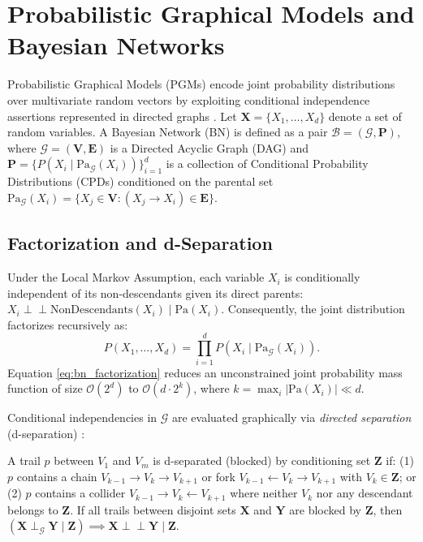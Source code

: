\section{Probabilistic Graphical Models and Bayesian Networks}
\label{sec:bg_pgm}

Probabilistic Graphical Models (PGMs) encode joint probability distributions over multivariate random vectors by exploiting conditional independence assertions represented in directed graphs \parencite{pearl2009causality, ankan2015pgmpy}. Let $\mathbf{X} = \{X_1, \dots, X_d\}$ denote a set of random variables. A Bayesian Network (BN) is defined as a pair $\mathcal{B} = (\mathcal{G}, \mathbf{P})$, where $\mathcal{G} = (\mathbf{V}, \mathbf{E})$ is a Directed Acyclic Graph (DAG) and $\mathbf{P} = \{P(X_i \mid \text{Pa}_{\mathcal{G}}(X_i))\}_{i=1}^d$ is a collection of Conditional Probability Distributions (CPDs) conditioned on the parental set $\text{Pa}_{\mathcal{G}}(X_i) = \{X_j \in \mathbf{V} : (X_j \to X_i) \in \mathbf{E}\}$.

\subsection{Factorization and d-Separation}

Under the Local Markov Assumption, each variable $X_i$ is conditionally independent of its non-descendants given its direct parents: $X_i \perp\!\!\!\perp \text{NonDescendants}(X_i) \mid \text{Pa}(X_i)$. Consequently, the joint distribution factorizes recursively as:
\begin{equation}
    P(X_1, \dots, X_d) = \prod_{i=1}^d P(X_i \mid \text{Pa}_{\mathcal{G}}(X_i)).
    \label{eq:bn_factorization}
\end{equation}
Equation \eqref{eq:bn_factorization} reduces an unconstrained joint probability mass function of size $\mathcal{O}(2^d)$ to $\mathcal{O}(d \cdot 2^k)$, where $k = \max_i |\text{Pa}(X_i)| \ll d$.

Conditional independencies in $\mathcal{G}$ are evaluated graphically via \textit{directed separation} (d-separation) \parencite{pearl2009causality}:
\begin{definition}[d-separation]
A trail $p$ between $V_1$ and $V_m$ is d-separated (blocked) by conditioning set $\mathbf{Z}$ if: (1) $p$ contains a chain $V_{k-1} \to V_k \to V_{k+1}$ or fork $V_{k-1} \leftarrow V_k \to V_{k+1}$ with $V_k \in \mathbf{Z}$; or (2) $p$ contains a collider $V_{k-1} \to V_k \leftarrow V_{k+1}$ where neither $V_k$ nor any descendant belongs to $\mathbf{Z}$. If all trails between disjoint sets $\mathbf{X}$ and $\mathbf{Y}$ are blocked by $\mathbf{Z}$, then $(\mathbf{X} \perp_{\mathcal{G}} \mathbf{Y} \mid \mathbf{Z}) \implies \mathbf{X} \perp\!\!\!\perp \mathbf{Y} \mid \mathbf{Z}$.
\end{definition}

